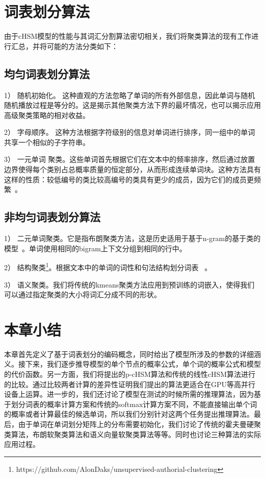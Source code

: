 \section{词表划分算法}
由于cHSM模型的性能与其词汇分割算法密切相关，我们将聚类算法的现有工作进行汇总，并将可能的方法分类如下：

\subsection{均匀词表划分算法}
1） 随机初始化。 这种直观的方法忽略了单词的所有外部信息，因此单词与随机随机播放过程是等分的。这是揭示其他聚类方法下界的最坏情况，也可以揭示应用高级聚类策略的相对收益。

2） 字母顺序。 这种方法根据字符级别的信息对单词进行排序，同一组中的单词共享一个相似的子字符串。

3） 一元单词 聚类。这些单词首先根据它们在文本中的频率排序，然后通过放置边界使得每个类别占总概率质量的恒定部分，从而形成连续单词块。这种方法具有这样的性质：较低编号的类比较高编号的类具有更少的成员，因为它们的成员更频繁~。


\subsection{非均匀词表划分算法}
1） 二元单词聚类。它是指布朗聚类方法，这是历史适用于基于n-gram的基于类的模型~。单词使用相同的bigram上下文分组到相同的行中。

2） 结构聚类\footnote{https://github.com/AlonDaks/unsupervised-authorial-clustering}。根据文本中的单词的词性和句法结构划分词表~ 。

3） 语义聚类。我们将传统的kmeans聚类方法应用到预训练的词嵌入，使得我们可以通过指定聚类的大小将词汇分成不同的形状。

\section{本章小结}
本章首先定义了基于词表划分的编码概念，同时给出了模型所涉及的参数的详细涵义。接下来，我们逐步推导模型的单个节点的概率公式，单个词的概率公式和模型的代价函数。另一方面，我们将提出的p-cHSM算法和传统的线性cHSM算法进行的比较。通过比较两者计算的差异性证明我们提出的算法更适合在GPU等高并行设备上运算。进一步的，我们还讨论了模型在测试的时候所需的推理算法，因为基于划分词表的概率计算方案和传统的softmax计算方案不同，不能直接输出单个词的概率或者计算最佳的候选单词，所以我们分别针对这两个任务提出推理算法。最后，由于单词在单词划分矩阵上的分布需要初始化，我们讨论了传统的霍夫曼硬聚类算法，布朗软聚类算法和语义向量软聚类算法等等。同时也讨论三种算法的实际应用过程。